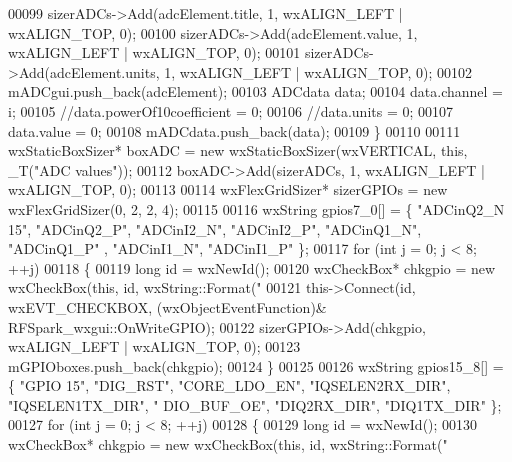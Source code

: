 \begin{DoxyCode}
{00099         sizerADCs->Add(adcElement.title, 1, wxALIGN\_LEFT | wxALIGN\_TOP, 0);
00100         sizerADCs->Add(adcElement.value, 1, wxALIGN\_LEFT | wxALIGN\_TOP, 0);
00101         sizerADCs->Add(adcElement.units, 1, wxALIGN\_LEFT | wxALIGN\_TOP, 0);
00102         mADCgui.push\_back(adcElement);
00103         ADCdata data;
00104         data.channel = i;
00105         \textcolor{comment}{//data.powerOf10coefficient = 0;}
00106         \textcolor{comment}{//data.units = 0;}
00107         data.value = 0;
00108         mADCdata.push\_back(data);
00109     \}
00110 
00111     wxStaticBoxSizer* boxADC = \textcolor{keyword}{new} wxStaticBoxSizer(wxVERTICAL, \textcolor{keyword}{this}, _T(\textcolor{stringliteral}{"ADC values"}));
00112     boxADC->Add(sizerADCs, 1, wxALIGN\_LEFT | wxALIGN\_TOP, 0);
00113 
00114     wxFlexGridSizer* sizerGPIOs = \textcolor{keyword}{new} wxFlexGridSizer(0, 2, 2, 4);
00115 
00116     wxString gpios7\_0[] = \{ \textcolor{stringliteral}{"ADCinQ2\_N 15"}, \textcolor{stringliteral}{"ADCinQ2\_P"}, \textcolor{stringliteral}{"ADCinI2\_N"}, \textcolor{stringliteral}{"ADCinI2\_P"}, \textcolor{stringliteral}{"ADCinQ1\_N"}, \textcolor{stringliteral}{"ADCinQ1\_P"}
      , \textcolor{stringliteral}{"ADCinI1\_N"}, \textcolor{stringliteral}{"ADCinI1\_P"} \};
00117     \textcolor{keywordflow}{for} (\textcolor{keywordtype}{int} j = 0; j < 8; ++j)
00118     \{
00119         \textcolor{keywordtype}{long} \textcolor{keywordtype}{id} = wxNewId();
00120         wxCheckBox* chkgpio = \textcolor{keyword}{new} wxCheckBox(\textcolor{keyword}{this}, \textcolor{keywordtype}{id}, wxString::Format(\textcolor{stringliteral}{"%
00121         this->Connect(\textcolor{keywordtype}{id}, wxEVT\_CHECKBOX, (wxObjectEventFunction)&
      RFSpark_wxgui::OnWriteGPIO);
00122         sizerGPIOs->Add(chkgpio, wxALIGN\_LEFT | wxALIGN\_TOP, 0);
00123         mGPIOboxes.push\_back(chkgpio);
00124     \}
00125 
00126     wxString gpios15\_8[] = \{ \textcolor{stringliteral}{"GPIO 15"}, \textcolor{stringliteral}{"DIG\_RST"}, \textcolor{stringliteral}{"CORE\_LDO\_EN"}, \textcolor{stringliteral}{"IQSELEN2RX\_DIR"}, \textcolor{stringliteral}{"IQSELEN1TX\_DIR"}, \textcolor{stringliteral}{"
      DIO\_BUF\_OE"}, \textcolor{stringliteral}{"DIQ2RX\_DIR"}, \textcolor{stringliteral}{"DIQ1TX\_DIR"} \};
00127     \textcolor{keywordflow}{for} (\textcolor{keywordtype}{int} j = 0; j < 8; ++j)
00128     \{
00129         \textcolor{keywordtype}{long} \textcolor{keywordtype}{id} = wxNewId();
00130         wxCheckBox* chkgpio = \textcolor{keyword}{new} wxCheckBox(\textcolor{keyword}{this}, \textcolor{keywordtype}{id}, wxString::Format(\textcolor{stringliteral}{"%
}}}
\end{DoxyCode}
